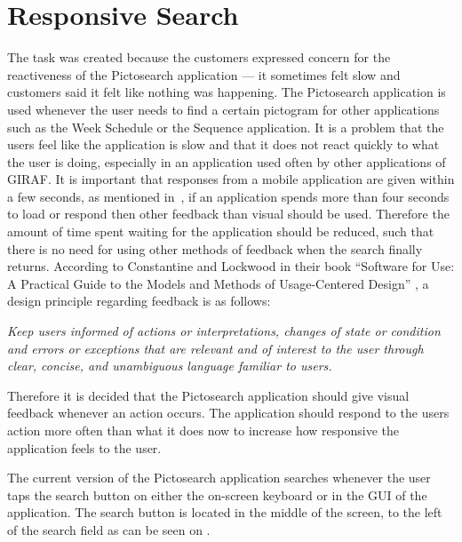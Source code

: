 \section{Responsive Search}\label{RSearch}
\begin{center}
\end{center}

The task was created because the customers expressed concern for the reactiveness of the Pictosearch application --- it sometimes felt slow and customers said it felt like nothing was happening.
The Pictosearch application is used whenever the user needs to find a certain pictogram for other applications such as the Week Schedule or the Sequence application.
It is a problem that the users feel like the application is slow and that it does not react quickly to what the user is doing, especially in an application used often by other applications of GIRAF.
It is important that responses from a mobile application are given within a few seconds, as mentioned in~\cite{Roto:2005:NNF:1062745.1062747}, if an application spends more than four seconds to load or respond then other feedback than visual should be used.
Therefore the amount of time spent waiting for the application should be reduced, such that there is no need for using other methods of feedback when the search finally returns.
According to Constantine and Lockwood in their book \enquote{Software for Use: A Practical Guide to the Models and Methods of Usage-Centered Design} \cite{DESIGNBOOK}, a design principle regarding feedback is as follows:

\begin{displayquote}
\textit{Keep users informed of actions or interpretations, changes of state or condition and errors or exceptions that are relevant and of interest to the user through clear, concise, and unambiguous language familiar to users\cite[p.~57]{DESIGNBOOK}.}
\end{displayquote}

Therefore it is decided that the Pictosearch application should give visual feedback whenever an action occurs.
The application should respond to the users action more often than what it does now to increase how responsive the application feels to the user.

The current version of the Pictosearch application searches whenever the user taps the search button on either the on-screen keyboard or in the GUI of the application.
The search button is located in the middle of the screen, to the left of the search field as can be seen on .

